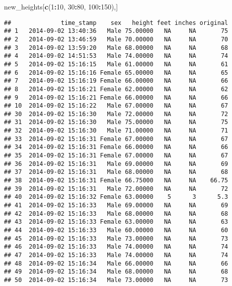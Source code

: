 \documentclass[
]{article}
\newenvironment{Shaded}{\begin{snugshade}}{\end{snugshade}}
\newcommand{\DecValTok}[1]{\textcolor[rgb]{0.00,0.00,0.81}{#1}}
\newcommand{\FunctionTok}[1]{\textcolor[rgb]{0.13,0.29,0.53}{\textbf{#1}}}
\newcommand{\NormalTok}[1]{#1}
\newcommand{\SpecialCharTok}[1]{\textcolor[rgb]{0.81,0.36,0.00}{\textbf{#1}}}
\begin{document}
\begin{Shaded}
\begin{Highlighting}[]
\NormalTok{new\_heights[}\FunctionTok{c}\NormalTok{(}\DecValTok{1}\SpecialCharTok{:}\DecValTok{10}\NormalTok{, }\DecValTok{30}\SpecialCharTok{:}\DecValTok{80}\NormalTok{, }\DecValTok{100}\SpecialCharTok{:}\DecValTok{150}\NormalTok{),]}
\end{Highlighting}
\end{Shaded}

\begin{verbatim}
##              time_stamp    sex   height feet inches original
## 1   2014-09-02 13:40:36   Male 75.00000   NA     NA       75
## 2   2014-09-02 13:46:59   Male 70.00000   NA     NA       70
## 3   2014-09-02 13:59:20   Male 68.00000   NA     NA       68
## 4   2014-09-02 14:51:53   Male 74.00000   NA     NA       74
## 5   2014-09-02 15:16:15   Male 61.00000   NA     NA       61
## 6   2014-09-02 15:16:16 Female 65.00000   NA     NA       65
## 7   2014-09-02 15:16:19 Female 66.00000   NA     NA       66
## 8   2014-09-02 15:16:21 Female 62.00000   NA     NA       62
## 9   2014-09-02 15:16:21 Female 66.00000   NA     NA       66
## 10  2014-09-02 15:16:22   Male 67.00000   NA     NA       67
## 30  2014-09-02 15:16:30   Male 72.00000   NA     NA       72
## 31  2014-09-02 15:16:30   Male 75.00000   NA     NA       75
## 32  2014-09-02 15:16:30   Male 71.00000   NA     NA       71
## 33  2014-09-02 15:16:31 Female 67.00000   NA     NA       67
## 34  2014-09-02 15:16:31 Female 66.00000   NA     NA       66
## 35  2014-09-02 15:16:31 Female 67.00000   NA     NA       67
## 36  2014-09-02 15:16:31   Male 69.00000   NA     NA       69
## 37  2014-09-02 15:16:31   Male 68.00000   NA     NA       68
## 38  2014-09-02 15:16:31 Female 66.75000   NA     NA    66.75
## 39  2014-09-02 15:16:31   Male 72.00000   NA     NA       72
## 40  2014-09-02 15:16:32 Female 63.00000    5      3      5.3
## 41  2014-09-02 15:16:33   Male 69.00000   NA     NA       69
## 42  2014-09-02 15:16:33   Male 68.00000   NA     NA       68
## 43  2014-09-02 15:16:33 Female 63.00000   NA     NA       63
## 44  2014-09-02 15:16:33   Male 60.00000   NA     NA       60
## 45  2014-09-02 15:16:33   Male 73.00000   NA     NA       73
## 46  2014-09-02 15:16:33   Male 74.00000   NA     NA       74
## 47  2014-09-02 15:16:33   Male 74.00000   NA     NA       74
## 48  2014-09-02 15:16:34   Male 66.00000   NA     NA       66
## 49  2014-09-02 15:16:34   Male 68.00000   NA     NA       68
## 50  2014-09-02 15:16:34   Male 73.00000   NA     NA       73

\end{verbatim}
\end{document}

